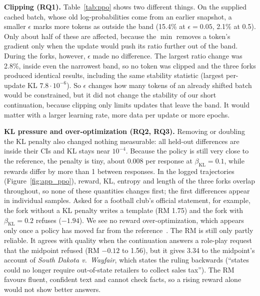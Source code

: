\documentclass{article}
\begin{document}
\textbf{Clipping (RQ1).} Table~\ref{tab:ppo} shows two different things. On the supplied cached batch, whose old log-probabilities come from an earlier snapshot, a smaller $\epsilon$ marks more tokens as outside the band (15.4\% at $\epsilon=0.05$, 2.1\% at 0.5). Only about half of these are affected, because the $\min$ removes a token's gradient only when the update would push its ratio further out of the band. During the forks, however, $\epsilon$ made no difference. The largest ratio change was 2.8\%, inside even the narrowest band, so no token was clipped and the three forks produced identical results, including the same stability statistic (largest per-update KL $7.8\cdot10^{-6}$). So $\epsilon$ changes how many tokens of an already shifted batch would be constrained, but it did not change the stability of our short continuation, because clipping only limits updates that leave the band. It would matter with a larger learning rate, more data per update or more epochs.

\textbf{KL pressure and over-optimization (RQ2, RQ3).} Removing or doubling the KL penalty also changed nothing measurable: all held-out differences are inside their CIs and KL stays near $10^{-4}$. Because the policy is still very close to the reference, the penalty is tiny, about 0.008 per response at $\beta_{\text{KL}}=0.1$, while rewards differ by more than 1 between responses. In the logged trajectories (Figure~\ref{fig:app_ppo}), reward, KL, entropy and length of the three forks overlap throughout, so none of these quantities changes first; the first differences appear in individual samples. Asked for a football club's official statement, for example, the fork without a KL penalty writes a template (RM 1.75) and the fork with $\beta_{\text{KL}}=0.2$ refuses ($-1.94$). We see no reward over-optimization, which appears only once a policy has moved far from the reference~\cite{gao2023scaling}. The RM is still only partly reliable. It agrees with quality when the continuation answers a role-play request that the midpoint refused (RM $-0.12$ to 1.56), but it gives 3.34 to the midpoint's account of \emph{South Dakota v.\ Wayfair}, which states the ruling backwards (``states could no longer require out-of-state retailers to collect sales tax''). The RM favours fluent, confident text and cannot check facts, so a rising reward alone would not show better answers.

\end{document}
